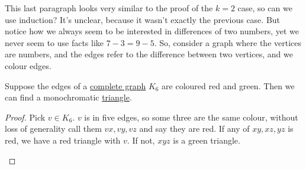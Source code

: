 \documentclass{article}
\newcommand{\red}[1]{\textcolor{bred}{#1}}
\newcommand{\green}[1]{\textcolor{bgreen}{#1}}
\begin{document}
This last paragraph looks very similar to the proof of the $k=2$ case, so can we use induction? It's unclear, because it wasn't exactly the previous case.  But notice how we always seem to be interested in differences of two numbers, yet we never seem to use facts like $7-3 = 9-5$.
So, consider a graph where the vertices are numbers, and the edges refer to the difference between two vertices, and we colour edges.

Suppose the edges of a \hyperlink{def:Kn}{complete graph} $K_6$ are coloured \red{red} and \green{green}. Then we can find a monochromatic \hyperref[def:triangle]{triangle}.
\begin{proof}
    Pick $v \in K_6$. $v$ is in five edges, so some three are the same colour, without loss of generality call them $vx, vy, vz$ and say they are \red{red}.
    If any of $xy, xz, yz$ is \red{red}, we have a \red{red triangle} with $v$.
    If not, $xyz$ is a \green{green triangle}.
    \begin{center}
    \end{center}
\end{proof}
\end{document}

